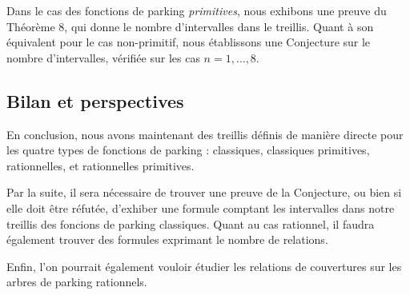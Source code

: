\documentclass[11pt]{article}
\begin{document}
Dans le cas des fonctions de parking \emph{primitives}, nous exhibons
une preuve du Théorème 8, qui donne le nombre d'intervalles dans le
treillis.
Quant à son équivalent pour le cas non-primitif, nous établissons une
Conjecture sur le nombre d'intervalles, vérifiée sur les cas
$n = 1, \ldots, 8$.

\subsection*{Bilan et perspectives}
En conclusion, nous avons maintenant des treillis définis de manière
directe pour les quatre types de fonctions de parking : classiques, 
classiques primitives, rationnelles, et rationnelles primitives.

Par la suite, il sera nécessaire de trouver une preuve de la Conjecture,
ou bien si elle doit être réfutée, d'exhiber une formule comptant les
intervalles dans notre treillis des foncions de parking classiques.
Quant au cas rationnel, il faudra également trouver des formules exprimant
le nombre de relations.

Enfin, l'on pourrait également vouloir étudier les relations de couvertures
sur les arbres de parking rationnels. 

\newpage

\tableofcontents



\end{document}
